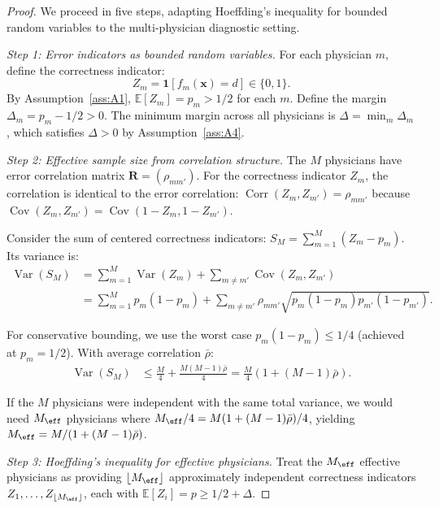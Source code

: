 \documentclass[11pt,a4paper]{article}
\theoremstyle{definition}
\DeclareMathOperator{\Var}{Var}
\DeclareMathOperator{\Cov}{Cov}
\DeclareMathOperator{\Corr}{Corr}
\newcommand{\E}{\mathbb{E}}
\newcommand{\ind}[1]{\mathbf{1}[#1]}
\newcommand{\disease}{d}                       %
\begin{document}
\begin{proof}
We proceed in five steps, adapting Hoeffding's inequality for bounded
random variables to the multi-physician diagnostic setting.

\medskip\noindent\textit{Step 1: Error indicators as bounded random variables.}
For each physician $m$, define the correctness indicator:
\begin{equation}\label{eq:correct_ind}
    Z_m = \ind{f_m(\mathbf{x}) = \disease} \in \{0, 1\}.
\end{equation}
By Assumption~\ref{ass:A1}, $\E[Z_m] = p_m > 1/2$ for each $m$.
Define the margin $\Delta_m = p_m - 1/2 > 0$. The minimum margin across
all physicians is $\Delta = \min_m \Delta_m$, which satisfies $\Delta > 0$
by Assumption~\ref{ass:A4}.

\medskip\noindent\textit{Step 2: Effective sample size from correlation structure.}
The $M$ physicians have error correlation matrix $\mathbf{R} = (\rho_{mm'})$.
For the correctness indicator $Z_m$, the correlation is identical to the
error correlation: $\Corr(Z_m, Z_{m'}) = \rho_{mm'}$ because
$\Cov(Z_m, Z_{m'}) = \Cov(1 - Z_m, 1 - Z_{m'})$.

Consider the sum of centered correctness indicators:
$S_M = \sum_{m=1}^{M} (Z_m - p_m)$. Its variance is:
\begin{align}
    \Var(S_M) &= \sum_{m=1}^{M} \Var(Z_m) + \sum_{m \neq m'} \Cov(Z_m, Z_{m'}) \\
    &= \sum_{m=1}^{M} p_m(1-p_m) + \sum_{m \neq m'} \rho_{mm'} \sqrt{p_m(1-p_m) p_{m'}(1-p_{m'})}.
\end{align}

For conservative bounding, we use the worst case $p_m(1-p_m) \le 1/4$ (achieved
at $p_m = 1/2$). With average correlation $\bar{\rho}$:
\begin{align}
    \Var(S_M) &\le \frac{M}{4} + \frac{M(M-1)\bar{\rho}}{4} = \frac{M}{4}(1 + (M-1)\bar{\rho}).
\end{align}

If the $M$ physicians were independent with the same total variance, we would
need $M_{\eff}$ physicians where $M_{\eff}/4 = M(1 + (M-1)\bar{\rho})/4$,
yielding $M_{\eff} = M / (1 + (M-1)\bar{\rho})$.

\medskip\noindent\textit{Step 3: Hoeffding's inequality for effective physicians.}
Treat the $M_{\eff}$ effective physicians as providing $\lfloor M_{\eff} \rfloor$
approximately independent correctness indicators $Z_1, \dots, Z_{\lfloor M_{\eff} \rfloor}$,
each with $\E[Z_i] = p \ge 1/2 + \Delta$.


\end{proof}
\end{document}
